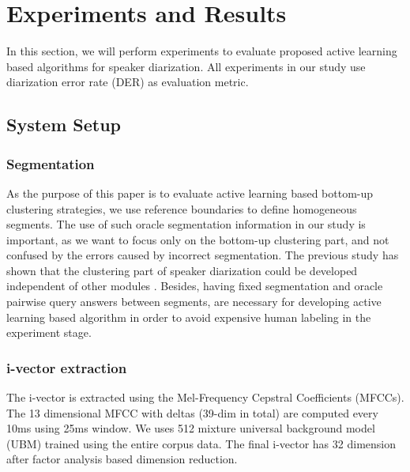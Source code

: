 \documentclass[journal,10pt]{IEEEtran}
\begin{document}
\section{Experiments and Results}
\label{exp}
In this section, we will perform experiments to evaluate proposed active learning based algorithms for speaker diarization. All experiments in our study use diarization error rate (DER) as evaluation metric.
\subsection{System Setup}
\subsubsection{Segmentation}
As the purpose of this paper is to evaluate active learning based bottom-up clustering strategies, we use reference boundaries to define homogeneous segments. The use of such oracle segmentation information in our study is important, as we want to focus only on the bottom-up clustering part, and not confused by the errors caused by incorrect segmentation. The previous study has shown that the clustering part of speaker diarization could be developed independent of other modules \cite{shum2013unsupervised,sinclair2013challenges}. Besides, having fixed segmentation and oracle pairwise query answers between segments, are necessary for developing active learning based algorithm in order to avoid expensive human labeling in the experiment stage.

\subsubsection{i-vector extraction}
The i-vector is extracted using the Mel-Frequency Cepstral Coefficients (MFCCs). The 13 dimensional MFCC with deltas (39-dim in total) are computed every 10ms using 25ms window. We uses 512 mixture universal background model (UBM) trained using the entire corpus data. The final i-vector has 32 dimension after factor analysis based dimension reduction. 
\end{document}
